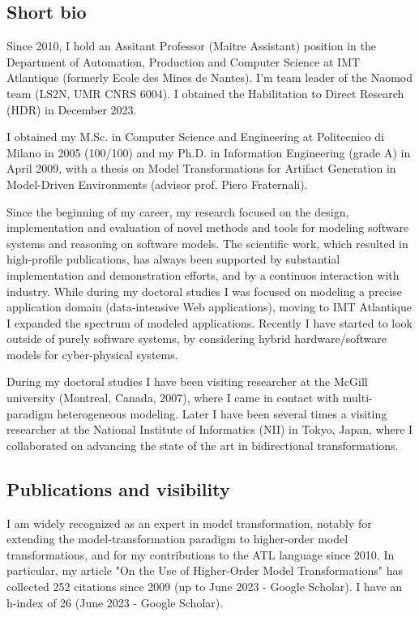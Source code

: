 
\subsection*{Short bio}

Since 2010, I hold an Assitant Professor (Maitre Assistant) position in the Department of Automation, Production and Computer Science at IMT Atlantique (formerly Ecole des Mines de Nantes). I’m team leader of the Naomod team (LS2N, UMR CNRS 6004). I obtained the Habilitation to Direct Research (HDR) in December 2023.

I obtained my M.Sc. in Computer Science and Engineering at Politecnico di Milano in 2005 (100/100) and my Ph.D. in Information Engineering (grade A) in April 2009, with a thesis on Model Transformations for Artifact Generation in Model-Driven Environments (advisor prof. Piero Fraternali).

Since the beginning of my career, my research focused on the design, implementation and evaluation of novel methods and tools for modeling software systems and reasoning on software models. The scientific work, which resulted in high-profile publications, has always been supported by substantial implementation and demonstration efforts, and by a continuos interaction with industry. While during my doctoral studies I was focused on modeling a precise application domain (data-intensive Web applications), moving to IMT Atlantique I expanded the spectrum of modeled applications. Recently I have started to look outside of purely software systems, by considering hybrid hardware/software models for cyber-physical systems.

During my doctoral studies I have been visiting researcher at the McGill university (Montreal, Canada, 2007), where I came in contact with multi-paradigm heterogeneous modeling. Later I have been several times a visiting researcher at the National Institute of Informatics (NII) in Tokyo, Japan, where I collaborated on advancing the state of the art in bidirectional transformations.

\subsection*{Publications and visibility}

I am widely recognized as an expert in model transformation, notably for extending the model-transformation paradigm to higher-order model transformations, and for my contributions to the ATL language since 2010. In particular, my article "On the Use of Higher-Order Model Transformations" has collected 252 citations since 2009 (up to June 2023 - Google Scholar). I have an h-index of 26 (June 2023 - Google Scholar).


